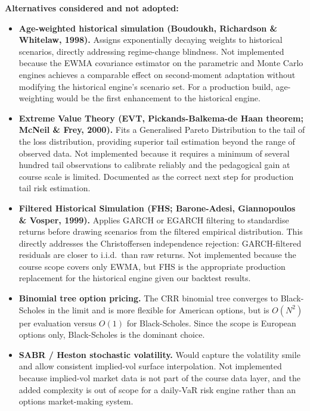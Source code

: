 \documentclass[11pt]{article}
\begin{document}
\textbf{Alternatives considered and not adopted:}

\begin{itemize}
  \item \textbf{Age-weighted historical simulation (Boudoukh, Richardson
    \& Whitelaw, 1998).}  Assigns exponentially decaying weights to
    historical scenarios, directly addressing regime-change blindness.
    Not implemented because the EWMA covariance estimator on the
    parametric and Monte Carlo engines achieves a comparable effect on
    second-moment adaptation without modifying the historical engine's
    scenario set.  For a production build, age-weighting would be the
    first enhancement to the historical engine.

  \item \textbf{Extreme Value Theory (EVT, Pickands-Balkema-de Haan
    theorem; McNeil \& Frey, 2000).}  Fits a Generalised Pareto
    Distribution to the tail of the loss distribution, providing superior
    tail estimation beyond the range of observed data.  Not implemented
    because it requires a minimum of several hundred tail observations to
    calibrate reliably and the pedagogical gain at course scale is limited.
    Documented as the correct next step for production tail risk estimation.

  \item \textbf{Filtered Historical Simulation (FHS; Barone-Adesi,
    Giannopoulos \& Vosper, 1999).}  Applies GARCH or EGARCH filtering
    to standardise returns before drawing scenarios from the filtered
    empirical distribution.  This directly addresses the Christoffersen
    independence rejection: GARCH-filtered residuals are closer to
    i.i.d.\ than raw returns.  Not implemented because the course scope
    covers only EWMA, but FHS is the appropriate production replacement
    for the historical engine given our backtest results.

  \item \textbf{Binomial tree option pricing.}  The CRR binomial tree
    converges to Black-Scholes in the limit and is more flexible for
    American options, but is $O(N^2)$ per evaluation versus $O(1)$
    for Black-Scholes.  Since the scope is European options only,
    Black-Scholes is the dominant choice.

  \item \textbf{SABR / Heston stochastic volatility.}  Would capture the
    volatility smile and allow consistent implied-vol surface
    interpolation.  Not implemented because implied-vol market data is not
    part of the course data layer, and the added complexity is out of scope
    for a daily-VaR risk engine rather than an options market-making system.
\end{itemize}
\end{document}
